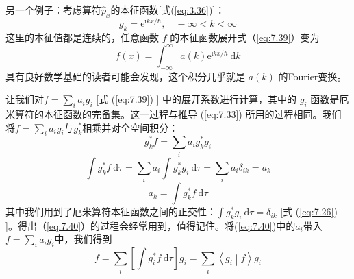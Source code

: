     另一个例子：考虑算符$\hat{p}_x$的本征函数[式(\ref{eq:3.36})]：
    \begin{equation*}
        g_k = \mathrm{e}^{\mathrm{i}kx/\hbar}, \quad -\infty < k < \infty
    \end{equation*}
    这里的本征值都是连续的，任意函数 $f$ 的本征函数展开式（\ref{eq:7.39}）变为
    \begin{equation*}
        f\left(x\right) = \int_{-\infty}^{\infty} a\left(k\right) \mathrm{e}^{\mathrm{i}kx/\hbar} \:\mathrm{d}k
    \end{equation*}
    具有良好数学基础的读者可能会发现，这个积分几乎就是 $a\left(k\right)$ 的Fourier变换。

    让我们对$f=\sum_{i}a_ig_i$ [式 (\ref{eq:7.39}) ] 中的展开系数进行计算，其中的 $g_i$ 函数是厄米算符的本征函数的完备集。这一过程与推导 (\ref{eq:7.33}) 所用的过程相同。我们将$f = \sum_{i}a_ig_i$与$g_k^{\ast}$相乘并对全空间积分：
    \begin{equation*}
        g_k^{\ast} f = \sum_{i} a_i g_k^{\ast} g_i
    \end{equation*}
    \begin{equation*}
        \int g_k^{\ast} f \:\mathrm{d}\tau = \sum_{i} a_i \int g_k^{\ast} g_i \:\mathrm{d}\tau = \sum_{i} a_i \delta_{ik} = a_k
    \end{equation*}
    \begin{equation}
        a_k = \int g_k^{\ast} f \:\mathrm{d}\tau
        \label{eq:7.40}
    \end{equation}
    其中我们用到了厄米算符本征函数之间的正交性：$\int g_k^{\ast} g_i \:\mathrm{d}\tau = \delta_{ik}$ [式 (\ref{eq:7.26}) ]。得出（\ref{eq:7.40}）的过程会经常用到，值得记住。将(\ref{eq:7.40})中的$a_i$带入$f = \sum_{i}a_ig_i$中，我们得到
    \begin{equation}
        f = \sum_{i}\left[\int g_i^{\ast}f \:\mathrm{d}\tau\right]g_i = \sum_{i}\left\langle g_i \middle| f \right\rangle g_i
        \label{eq:7.41}
    \end{equation}

